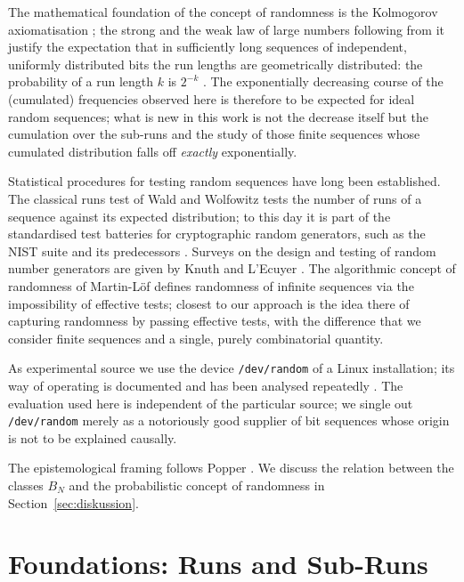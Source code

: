 \documentclass[11pt,a4paper]{scrartcl}
\theoremstyle{plain}
\theoremstyle{definition}
\theoremstyle{remark}
\begin{document}
The mathematical foundation of the concept of randomness is the
Kolmogorov axiomatisation \cite{kolmogoroff1933}; the strong and the
weak law of large numbers following from it justify the expectation
that in sufficiently long sequences of independent, uniformly
distributed bits the run lengths are geometrically distributed: the
probability of a run length $k$ is $2^{-k}$ \cite[and the exercises on
runs therein]{feller1968}. The exponentially decreasing course of the
(cumulated) frequencies observed here is therefore to be expected for
ideal random sequences; what is new in this work is not the decrease
itself but the cumulation over the sub-runs and the study of those
finite sequences whose cumulated distribution falls off
\emph{exactly} exponentially.

Statistical procedures for testing random sequences have long been
established. The classical runs test of Wald and Wolfowitz
\cite{waldwolfowitz1940} tests the number of runs of a sequence against
its expected distribution; to this day it is part of the standardised
test batteries for cryptographic random generators, such as the NIST
suite \cite{rukhin2010nist} and its predecessors
\cite{knuth1997,marsaglia1996}. Surveys on the design and testing of
random number generators are given by Knuth \cite{knuth1997} and
L'Ecuyer \cite{lecuyer1994}. The algorithmic concept of randomness of
Martin-Löf \cite{martinloef1966} defines randomness of infinite
sequences via the impossibility of effective tests; closest to our
approach is the idea there of capturing randomness by passing
effective tests, with the difference that we consider finite
sequences and a single, purely combinatorial quantity.

As experimental source we use the device \texttt{/dev/random} of a
Linux installation; its way of operating is documented and has been
analysed repeatedly \cite{gutterman2004}. The evaluation used here is
independent of the particular source; we single out
\texttt{/dev/random} merely as a notoriously good supplier of bit
sequences whose origin is not to be explained causally.

The epistemological framing follows Popper \cite{popper1935}. We
discuss the relation between the classes $B_N$ and the
probabilistic concept of randomness in Section~\ref{sec:diskussion}.

\section{Foundations: Runs and Sub-Runs}\label{sec:grundlagen}
\end{document}
